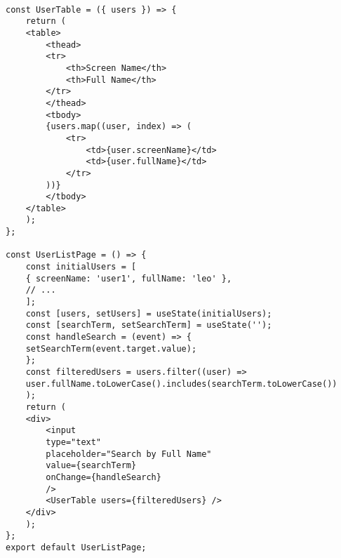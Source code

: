 \documentclass{article}
\begin{document}
\begin{lstlisting}[frame=single, basicstyle=\ttfamily, breaklines=true, breakatwhitespace=true, postbreak=\mbox{\textcolor{red}{$\hookrightarrow$}\space}]

const UserTable = ({ users }) => {
    return (
    <table>
        <thead>
        <tr>
            <th>Screen Name</th>
            <th>Full Name</th>
        </tr>
        </thead>
        <tbody>
        {users.map((user, index) => (
            <tr>
                <td>{user.screenName}</td>
                <td>{user.fullName}</td>
            </tr>
        ))}
        </tbody>
    </table>
    );
};

const UserListPage = () => {
    const initialUsers = [
    { screenName: 'user1', fullName: 'leo' },
    // ...
    ];
    const [users, setUsers] = useState(initialUsers);
    const [searchTerm, setSearchTerm] = useState('');
    const handleSearch = (event) => {
    setSearchTerm(event.target.value);
    };
    const filteredUsers = users.filter((user) =>
    user.fullName.toLowerCase().includes(searchTerm.toLowerCase())
    );
    return (
    <div>
        <input
        type="text"
        placeholder="Search by Full Name"
        value={searchTerm}
        onChange={handleSearch}
        />
        <UserTable users={filteredUsers} />
    </div>
    );
};
export default UserListPage;
    
\end{lstlisting}
\end{document}
